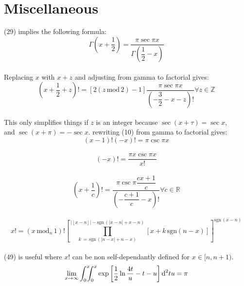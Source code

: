 \documentclass[12pt]{article}
\providecommand \pgrp [1] {\left( #1 \right)}   %
\providecommand \bgrp [1] {\left[ #1 \right]}   %
\providecommand \setZ {\mathbb Z}
\providecommand \setR {\mathbb R}
\providecommand \floor [1]{\left\lfloor #1 \right\rfloor}
\providecommand \abs [1] {\left| #1\right|}
\providecommand \sgn {\mathrm{sgn}\,}
\providecommand \sgnf [1]{\mathrm{sgn}\!\pgrp{#1}}
\providecommand \nhpx [1] {\hspace{-#1px}}
\begin{document}
\pagebreak
\section{Miscellaneous}
(29) implies the following formula:
\begin{equation}
	\Gamma\!\pgrp{x + \dfrac 12} = \dfrac{\pi \sec\pi x}{\Gamma\!\pgrp{\dfrac 12 - x}}
\end{equation}\\ %
Replacing $x$ with $x + z$ and adjusting from gamma to factorial gives:\\
\begin{equation}
	\pgrp{x + \dfrac 12 + z}! = \bgrp{2\pgrp{z \,\text{mod}\, 2} - 1}
	\dfrac{\pi \sec\pi x}{\pgrp{-\dfrac 32 - x - z}!} \forall z \in \setZ
\end{equation}\\ %
This only simplifies things if $z$ is an integer because $\sec(x + \tau) = \sec x$,\\
and $\sec(x + \pi) = -\sec x$. rewriting (10) from gamma to factorial gives:
\begin{equation}
	(x - 1)! (-x)! = \pi \csc \pi x
\end{equation}\\ %
\begin{equation}
	(-x)! = \dfrac{\pi x \csc \pi x}{x!}
\end{equation}\\ %
\begin{equation}
	\pgrp{x + \dfrac 1c}! = \dfrac{\pi \csc \pi\dfrac{cx + 1}c}
		{\pgrp{-\dfrac{c + 1}c - x}!} \forall c \in \setR
\end{equation}\\ %
\begin{equation}
	x! = \pgrp{x \,\text{mod}_n\, 1}! \bgrp{
		\prod_{
			k\,=\,\sgn\!(\abs{n - x} + n - x)
		}^{
			\abs{\floor{x - n}} - \sgn\!(\abs{x - n} + x - n)
		}
		\bgrp{x + k\,\sgnf{n - x}}
	}^{\sgn\!(x - n)}
\end{equation}\\ %
(49) is useful where $x!$ can be non self-dependantly defined for $x \in [n, n+1)$.\\
\begin{equation}
	\lim_{x\to\infty} \int_0^x\nhpx 6\int_0^x \exp\bgrp{\dfrac12\ln\dfrac{4t}u - t - u
	}\text d^2tu = \pi
\end{equation} %
\end{document}
